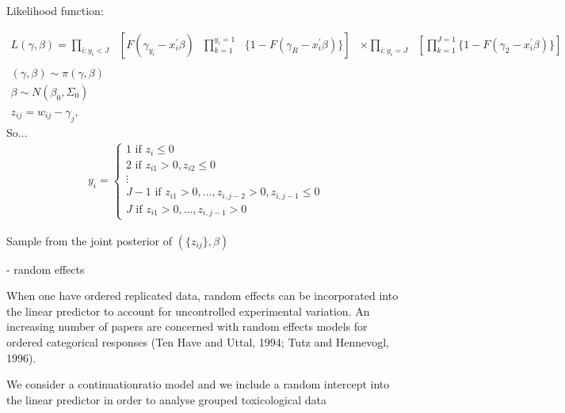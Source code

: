 Likelihood function:

\begin{eqnarray}
	L(\gamma,\beta) = \prod_{i\colon y_{i}<J}\text{ }[ F(\gamma_{y_{i}} - x_{i}^{'}\beta)\text{ }\prod_{k=1}^{y_{i}=1}\text{ }\{1-F(\gamma_{R}-x_{i}^{'}\beta)\}] &\times \displaystyle \prod_{i\colon y_{i}=J}\text{ }[\prod_{k=1}^{J=1} \{1-F(\gamma_{2} - x_{i}^{'}\beta)\}] \nonumber \\
	\nonumber \\
	(\gamma,\beta) \sim \pi (\gamma,\beta) & \nonumber \\
	\beta \sim N(\beta_{0},\Sigma_{0}) & \nonumber \\
	\nonumber \\
	z_{ij} = w_{ij} - \gamma_{j}, & \nonumber
	\end{eqnarray}
	So...
	\begin{eqnarray}
	y_{i} =
	\begin{cases}
	1\text{ if }z_{i} \leq 0 \nonumber \\
	2\text{ if }z_{i1} > 0, z_{i2} \leq 0 \nonumber \\
	\vdots \nonumber \\
	J-1\text{ if }z_{i1} > 0,...,z_{i,j-2}>0,z_{i,j-1}\leq0 \nonumber \\
	J\text{ if }z_{i1}>0,...,z_{i,j-1}>0
\end{cases}
\end{eqnarray}

Sample from the joint posterior of $(\{z_{ij}\},\beta)$

- random effects

When one have ordered replicated data, random effects can be incorporated into the linear predictor
to account for uncontrolled experimental variation. An increasing number of papers are concerned
with random effects models for ordered categorical responses (Ten Have and Uttal, 1994; Tutz and
Hennevogl, 1996).

\citep{have:uttal:1994}

\citep{tutz:hennevogl:1996}

We consider a continuationratio model and we include a random intercept into the linear predictor in order to analyse grouped
toxicological data


%

\citep{hoff:2007}
\citep{hollenbach:etal:2018}


